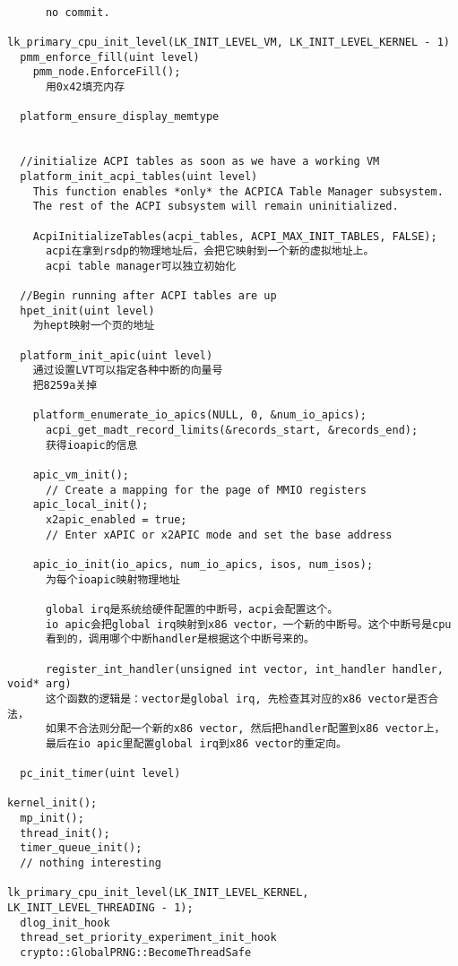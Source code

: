 \begin{verbatim}
      
      no commit.

lk_primary_cpu_init_level(LK_INIT_LEVEL_VM, LK_INIT_LEVEL_KERNEL - 1)
  pmm_enforce_fill(uint level)
    pmm_node.EnforceFill();
      用0x42填充内存

  platform_ensure_display_memtype


  //initialize ACPI tables as soon as we have a working VM
  platform_init_acpi_tables(uint level)
    This function enables *only* the ACPICA Table Manager subsystem.
    The rest of the ACPI subsystem will remain uninitialized.

    AcpiInitializeTables(acpi_tables, ACPI_MAX_INIT_TABLES, FALSE);
      acpi在拿到rsdp的物理地址后，会把它映射到一个新的虚拟地址上。
      acpi table manager可以独立初始化
  
  //Begin running after ACPI tables are up
  hpet_init(uint level)
    为hept映射一个页的地址

  platform_init_apic(uint level)
    通过设置LVT可以指定各种中断的向量号
    把8259a关掉

    platform_enumerate_io_apics(NULL, 0, &num_io_apics);
      acpi_get_madt_record_limits(&records_start, &records_end);
      获得ioapic的信息

    apic_vm_init();
      // Create a mapping for the page of MMIO registers
    apic_local_init();
      x2apic_enabled = true;
      // Enter xAPIC or x2APIC mode and set the base address

    apic_io_init(io_apics, num_io_apics, isos, num_isos);
      为每个ioapic映射物理地址

      global irq是系统给硬件配置的中断号，acpi会配置这个。
      io apic会把global irq映射到x86 vector，一个新的中断号。这个中断号是cpu
      看到的，调用哪个中断handler是根据这个中断号来的。

      register_int_handler(unsigned int vector, int_handler handler, void* arg)
      这个函数的逻辑是：vector是global irq, 先检查其对应的x86 vector是否合法，
      如果不合法则分配一个新的x86 vector, 然后把handler配置到x86 vector上，
      最后在io apic里配置global irq到x86 vector的重定向。

  pc_init_timer(uint level)

kernel_init();
  mp_init();
  thread_init();
  timer_queue_init();
  // nothing interesting

lk_primary_cpu_init_level(LK_INIT_LEVEL_KERNEL, LK_INIT_LEVEL_THREADING - 1);
  dlog_init_hook
  thread_set_priority_experiment_init_hook
  crypto::GlobalPRNG::BecomeThreadSafe


\end{verbatim}
